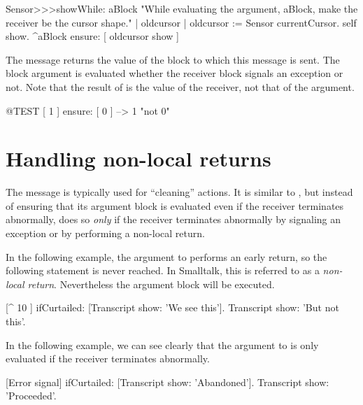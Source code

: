\documentclass[a4paper,10pt,twoside]{book}
\begin{document}
\begin{code}{}
Sensor>>>showWhile: aBlock 
	"While evaluating the argument, aBlock,
	make the receiver be the cursor shape."
	| oldcursor |
	oldcursor := Sensor currentCursor.
	self show.
	^aBlock ensure: [ oldcursor show ]
\end{code}

The message  returns the value of the block to which this message is sent. The block argument is evaluated whether the receiver block signals an exception or not. Note that the result of  is the value of the receiver, not that of the argument.

\begin{code}{@TEST}
[ 1 ] ensure: [ 0 ] --> 1    "not 0"
\end{code}

\section{Handling non-local returns}

The message  is typically used for ``cleaning'' actions. It is similar to , but instead of ensuring that its argument block is evaluated even if the receiver terminates abnormally,  does so \emph{only} if the receiver terminates abnormally by signaling an exception or by performing a non-local return.

In the following example, the argument to  performs an early return, so the following statement is never reached.
In Smalltalk, this is referred to as a \emph{non-local return}.
Nevertheless the argument block will be executed.
\begin{code}{}
[^ 10 ] ifCurtailed: [Transcript show: 'We see this'].
Transcript show: 'But not this'.
\end{code}

In the following example, we can see clearly that the argument to  is only evaluated if the receiver terminates abnormally.
\begin{code}{}
[Error signal] ifCurtailed: [Transcript show: 'Abandoned'].
Transcript show: 'Proceeded'.
\end{code}

\end{document}
